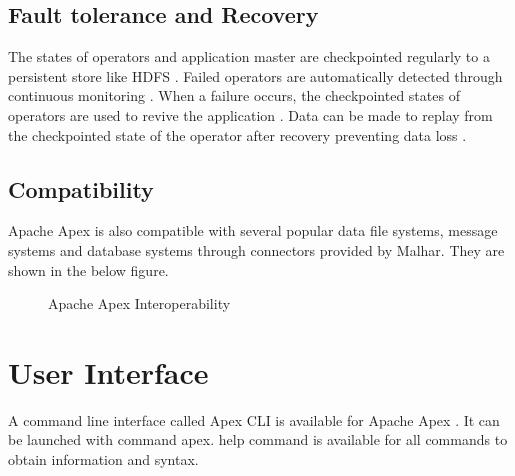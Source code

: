 \documentclass[9pt,twocolumn,twoside]{../../styles/osajnl}
\begin{document}
\subsection{Fault tolerance and Recovery}
The states of operators and application master are checkpointed regularly to a persistent store like HDFS \cite{www-apacheapexintroslideshare}.
Failed operators are automatically detected through continuous monitoring \cite{www-apacheapexintroslideshare}.
When a failure occurs, the checkpointed states of operators are used to revive the application \cite{www-apacheapexintroslideshare}.
Data can be made to replay from the checkpointed state of the operator after recovery preventing data loss \cite{www-apacheapexintroslideshare}.

\subsection{Compatibility}
Apache Apex is also compatible with several popular data file systems, message systems and database systems through connectors provided by Malhar. 
They are shown in the below figure.
\begin{figure}[ht!]
\centering
{}
\caption{Apache Apex Interoperability\cite{www-apacheapexblog}}
\label{fig:Apache Apex Interoperability}
\end{figure}




\section{User Interface}
A command line interface called Apex CLI is available for Apache Apex \cite{www-apacheapexclidoc}.
It can be launched with command  apex. help command is available for all commands to obtain information and syntax.
\end{document}
